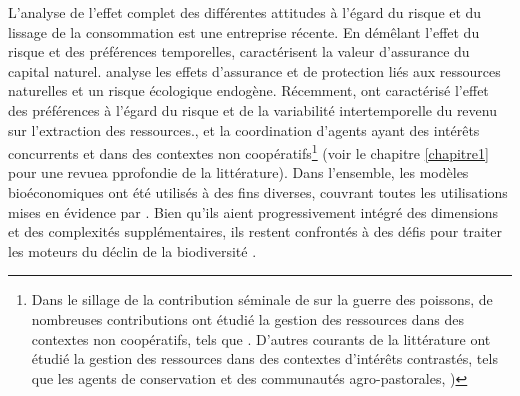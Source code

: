 {L'analyse de l'effet complet des différentes attitudes à l'égard du risque et du lissage de la consommation est une entreprise récente. En démêlant l'effet du risque et des préférences temporelles, \cite{quaas_2019_insurance, AugeraudVeron2019} caractérisent la valeur d'assurance du capital naturel. \cite{berry_2019} analyse les effets d'assurance et de protection liés aux ressources naturelles et un risque écologique endogène. Récemment, \cite{KELSALL2023102855} ont caractérisé l'effet des préférences à l'égard du risque et de la variabilité intertemporelle du revenu sur l'extraction des ressources.}, et la coordination d'agents ayant des intérêts concurrents et dans des contextes non coopératifs\footnote{Dans le sillage de la contribution séminale de \cite{levhari_great_1980} sur la guerre des poissons, de nombreuses contributions ont étudié la gestion des ressources dans des contextes non coopératifs, tels que \cite{janmaat_sharing_2005, kaffine_unitization_2010, costello_partial_2015, costello_private_2017}. D'autres courants de la littérature ont étudié la gestion des ressources dans des contextes d'intérêts contrastés, tels que les agents de conservation et des communautés agro-pastorales, \cite{Skonhoft1998, })} (voir le chapitre \ref{chapitre1} pour une revuea pprofondie de la littérature). 
Dans l'ensemble, les modèles bioéconomiques ont été utilisés à des fins diverses, couvrant toutes les utilisations mises en évidence par \cite{varenne_epistemologie_2014} . Bien qu'ils aient progressivement intégré des dimensions et des complexités supplémentaires, ils restent confrontés à des défis pour traiter les moteurs du déclin de la biodiversité \citep{Drechsler20200}.

